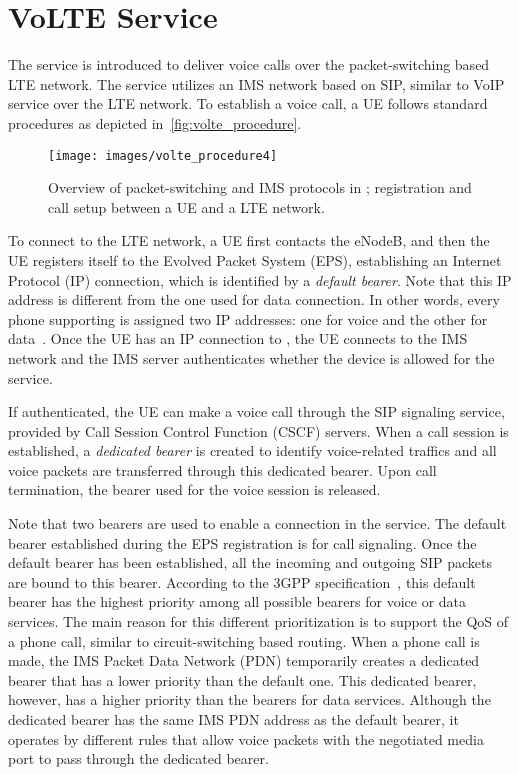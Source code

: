 \section{VoLTE Service}
\label{sec:volte_network}

The \vt service is introduced to deliver voice calls
over the packet-switching based LTE network.
The service utilizes an IMS network based on SIP,
similar to VoIP service over the LTE network.
To establish a voice call, a UE
follows standard procedures as depicted in~\autoref{fig:volte_procedure}.

\begin{figure}[h]
  \centering
  \texttt{[image: images/volte\_procedure4]}
  \caption{Overview of packet-switching and IMS protocols in \vt; registration and call setup
    between a UE and a LTE network.}
  \label{fig:volte_procedure}
\end{figure}

To connect to the LTE network,  a UE first contacts the eNodeB,
and then  the UE registers itself to the Evolved Packet System (EPS),
establishing an Internet Protocol (IP) connection, which is
identified by a \emph{default bearer}. Note that this IP address is
different from the one used for data connection. In other words, every
phone supporting \vt is assigned two IP addresses: one for
voice and the other for data~\cite{3gpp_ip}. 
%
Once the
UE has an IP connection to \vt,  the UE connects
to the IMS network and the IMS server authenticates whether the device
is allowed for the \vt service.

If authenticated,  the UE can make a voice call through
the SIP signaling service,
provided by Call Session Control Function (CSCF) servers.
%
When a call session is established,
 a \emph{dedicated bearer}
is created to identify voice-related traffics
and  all voice packets are transferred
through this dedicated bearer.
%
 Upon call termination, the bearer used for the
voice session is released.

Note that two bearers are used to enable a connection in the \vt service.
%
The default bearer
established during the EPS registration is for call signaling.
Once the default bearer has been established,
all the incoming and outgoing SIP packets are bound to
this bearer.
%
%
According to the 3GPP specification~\cite{3gpp_23203}, this default bearer
 has the highest priority among all possible bearers for voice or data services.
%
The main reason for this different prioritization is to support the
QoS of a phone call, similar to circuit-switching based routing.
%
When a phone call is made,
the IMS Packet Data Network (PDN) temporarily creates a dedicated bearer
that has a lower priority than the default one.
This dedicated bearer, however, has a higher priority than the bearers for data services.
%
Although the dedicated bearer has the same IMS PDN address as the default
bearer, it operates by different rules that allow voice packets with the
negotiated media port to pass through the dedicated bearer.

